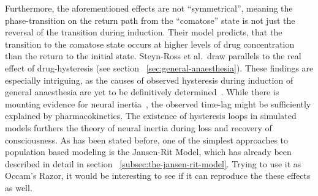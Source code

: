 Furthermore, the aforementioned effects are not ``symmetrical'',
meaning the phase-transition on the return path from the ``comatose'' state is not just the reversal of the transition
during induction.
Their model predicts, that the transition to the comatose state occurs at higher levels of drug concentration than
the return to the initial state.
Steyn-Ross et al.\ draw parallels to the real effect of drug-hysteresis (see section ~\ref{sec:general-anaesthesia}).
These findings are especially intriguing, as the causes of observed hysteresis during induction of general
anaesthesia are yet to be definitively determined~\cite{kuizenga_test_2018, sepulveda_evidence_2018}.
While there is mounting evidence for neural inertia~\cite{ferreira_patterns_2020},
the observed time-lag might be sufficiently explained by pharmacokinetics.
The existence of hysteresis loops in simulated models furthers the theory of neural inertia during loss and recovery
of consciousness.
As has been stated before, one of the simplest approaches to population based modeling is the Jansen-Rit Model,
which has already been described in detail in section ~\ref{subsec:the-jansen-rit-model}.
Trying to use it as Occam's Razor, it would be interesting to see if it can reproduce the these effects as well.
